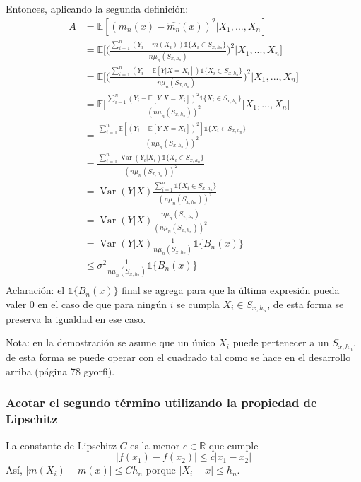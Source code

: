 \documentclass[12pt, a4paper]{article}
\begin{document}
Entonces, aplicando la segunda definición:
$$
\begin{aligned}
A &= \mathds{E}[ (m_n(x) - \hat{m_n}(x))^2 | X_1, ..., X_n ] \\
&= \mathds{E}\Bigg[ \Bigg( \frac{ \sum_{i=1}^{n} (Y_i - m(X_i)) \mathds{1}\{ X_i \in S_{x,h_n} \} }{n \mu_n(S_{x,h_n})} \Bigg)^2 | X_1, ..., X_n \Bigg] \\
&= \mathds{E}\Bigg[ \Bigg( \frac{ \sum_{i=1}^{n} (Y_i - \mathds{E}[Y|X=X_i]) \mathds{1}\{ X_i \in S_{x,h_n} \} }{n \mu_n(S_{x,h_n})} \Bigg)^2 | X_1, ..., X_n \Bigg] \\
&= \mathds{E}\Bigg[  \frac{ \sum_{i=1}^{n} (Y_i - \mathds{E}[Y|X=X_i])^2 \mathds{1}\{ X_i \in S_{x,h_n} \} }{(n \mu_n(S_{x,h_n}))^2}  | X_1, ..., X_n \Bigg] \\
&= \frac{ \sum_{i=1}^{n} \mathds{E}[(Y_i - \mathds{E}[Y|X=X_i])^2] \mathds{1}\{ X_i \in S_{x,h_n} \} }{(n \mu_n(S_{x,h_n}))^2} \\
&= \frac{ \sum_{i=1}^{n} \mathop{Var}(Y_i|X_i) \mathds{1}\{ X_i \in S_{x,h_n} \} }{(n \mu_n(S_{x,h_n}))^2} \\
&= \mathop{Var}(Y|X) \frac{ \sum_{i=1}^{n} \mathds{1}\{ X_i \in S_{x,h_n} \} }{(n \mu_n(S_{x,h_n}))^2} \\
&= \mathop{Var}(Y|X) \frac{n \mu_n(S_{x,h_n}) }{(n \mu_n(S_{x,h_n}))^2} \\
&= \mathop{Var}(Y|X) \frac{ 1 }{n \mu_n(S_{x,h_n})} \mathds{1} \{ B_n(x)\}\\
&\leq \sigma^2 \frac{ 1 }{n \mu_n(S_{x,h_n})} \mathds{1} \{ B_n(x)\}\\
\end{aligned}
$$
Aclaración: el $\mathds{1} \{ B_n(x)\}$ final se agrega para que la última expresión pueda valer 0 en el caso de que para ningún $i$ se cumpla $X_i \in S_{x,h_n}$, de esta forma se preserva la igualdad en ese caso.

Nota: en la demostración se asume que un único $X_i$ puede pertenecer a un $S_{x,h_n}$, de esta forma se puede operar con el cuadrado tal como se hace en el desarrollo arriba (página 78 gyorfi).

\subsubsection{Acotar el segundo término utilizando la propiedad de Lipschitz}
La constante de Lipschitz $C$ es la menor $c \in \mathds{R}$ que cumple 
$$
| f(x_1) -f(x_2) | \leq c | x_1 - x_2 |
$$
Así, $ |m(X_i)-m(x)| \leq C h_n $ porque $|X_i - x| \leq h_n$.
\end{document}
